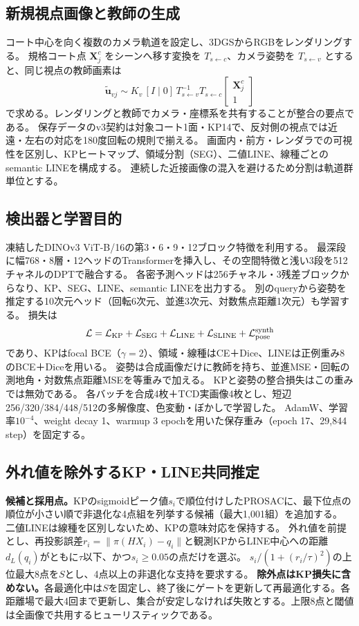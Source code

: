 \documentclass[a4paper,10pt]{article}
\begin{document}
\newpage
\subsection{新規視点画像と教師の生成}
コート中心を向く複数のカメラ軌道を設定し、3DGSからRGBをレンダリングする。
規格コート点 $\mathbf X_j^c$ をシーンへ移す変換を $T_{s\leftarrow c}$、カメラ姿勢を $T_{s\leftarrow v}$ とすると、同じ視点の教師画素は
\begin{equation}
\widetilde{\mathbf u}_{vj}\sim
K_v\,[I\mid0]\,T_{s\leftarrow v}^{-1}T_{s\leftarrow c}
\begin{bmatrix}\mathbf X_j^c\\1\end{bmatrix}
\end{equation}
で求める。レンダリングと教師でカメラ・座標系を共有することが整合の要点である。
保存データのv3契約は対象コート1面・KP14で、反対側の視点では近遠・左右の対応を180度回転の規則で揃える。
画面内・前方・レンダラでの可視性を区別し、KPヒートマップ、領域分割（SEG）、二値LINE、線種ごとのsemantic LINEを構成する。
連続した近接画像の混入を避けるため分割は軌道群単位とする。

\subsection{検出器と学習目的}
凍結したDINOv3 ViT-B/16の第3・6・9・12ブロック特徴を利用する。
最深段に幅768・8層・12ヘッドのTransformerを挿入し、その空間特徴と浅い3段を512チャネルのDPTで融合する。
各密予測ヘッドは256チャネル・3残差ブロックからなり、KP、SEG、LINE、semantic LINEを出力する。
別のqueryから姿勢を推定する10次元ヘッド（回転6次元、並進3次元、対数焦点距離1次元）も学習する。
損失は
\begin{equation}
\mathcal L=\mathcal L_{\rm KP}
+\mathcal L_{\rm SEG}+\mathcal L_{\rm LINE}
+\mathcal L_{\rm SLINE}+\mathcal L_{\rm pose}^{\rm synth}
\end{equation}
であり、KPはfocal BCE（$\gamma=2$）、領域・線種はCE＋Dice、LINEは正例重み8のBCE＋Diceを用いる。
姿勢は合成画像だけに教師を持ち、並進MSE・回転の測地角・対数焦点距離MSEを等重みで加える。
KPと姿勢の整合損失はこの重みでは無効である。
各バッチを合成4枚＋TCD実画像4枚とし、短辺256/320/384/448/512の多解像度、色変動・ぼかしで学習した。
AdamW、学習率$10^{-4}$、weight decay 1、warmup 3 epochを用いた保存重み（epoch 17、29,844 step）を固定する。

\subsection{外れ値を除外するKP・LINE共同推定}
\textbf{候補と採用点。}KPのsigmoidピーク値$s_i$で順位付けしたPROSAC\cite{prosac}に、最下位点の順位が小さい順で非退化な4点組を列挙する候補（最大1,001組）を追加する。
二値LINEは線種を区別しないため、KPの意味対応を保持する。
外れ値を前提とし、再投影誤差$r_i=\|\pi(HX_i)-q_i\|$と観測KPからLINE中心への距離$d_L(q_i)$がともに$\tau$以下、かつ$s_i\geq0.05$の点だけを選ぶ。
$s_i/(1+(r_i/\tau)^2)$の上位最大8点を$S$とし、4点以上の非退化な支持を要求する。
\textbf{除外点はKP損失に含めない。}各最適化中は$S$を固定し、終了後にゲートを更新して再最適化する。各距離場で最大4回まで更新し、集合が安定しなければ失敗とする。上限8点と閾値は全画像で共用するヒューリスティックである。
\end{document}
